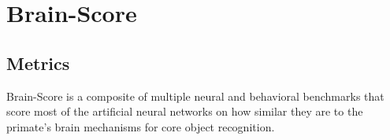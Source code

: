 \documentclass{article} %
\begin{document}



\section{Brain-Score}
\subsection{Metrics}
\label{brainscore-metrics}
Brain-Score is a composite of multiple neural and behavioral benchmarks that score most of the artificial neural networks on how similar they are to the primate's brain mechanisms for core object recognition\cite{schrimpf2020brain}.
\end{document}
